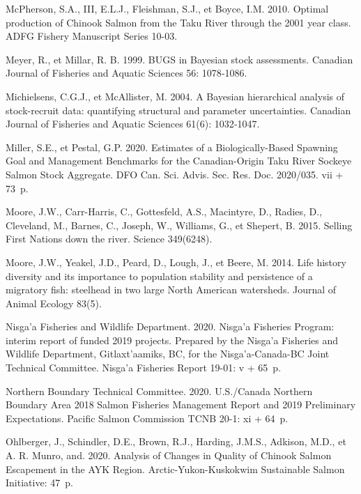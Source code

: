 \documentclass[french,11pt]{book}
\begin{document}
\begin{CSLReferences}{1}{0}
McPherson, S.A., III, E.L.J., Fleishman, S.J., et Boyce, I.M. 2010. {Optimal production of Chinook Salmon from the Taku River through the 2001 year class}. ADFG Fishery Manuscript Series 10-03.

Meyer, R., et Millar, R. B. 1999. {BUGS in Bayesian stock assessments}. Canadian Journal of Fisheries and Aquatic Sciences 56: 1078‑1086.

Michielsens, C.G.J., et McAllister, M. 2004. {A Bayesian hierarchical analysis of stock-recruit data: quantifying structural and parameter uncertainties}. Canadian Journal of Fisheries and Aquatic Sciences 61(6): 1032‑1047.

Miller, S.E., et Pestal, G.P. 2020. {Estimates of a Biologically-Based Spawning Goal and Management Benchmarks for the Canadian-Origin Taku River Sockeye Salmon Stock Aggregate}. DFO Can. Sci. Advis. Sec. Res. Doc. 2020/035. vii + 73~p.

Moore, J.W., Carr-Harris, C., Gottesfeld, A.S., Macintyre, D., Radies, D., Cleveland, M., Barnes, C., Joseph, W., Williams, G., et Shepert, B. 2015. {Selling First Nations down the river}. {Science} 349(6248).

Moore, J.W., Yeakel, J.D., Peard, D., Lough, J., et Beere, M. 2014. {Life history diversity and its importance to population stability and persistence of a migratory fish: steelhead in two large North American watersheds}. {Journal of Animal Ecology} 83(5).

Nisga'a Fisheries and Wildlife Department. 2020. {Nisga'a Fisheries Program: interim report of funded 2019 projects. Prepared by the Nisga'a Fisheries and Wildlife Department, Gitlaxt'aamiks, BC, for the Nisga'a-Canada-BC Joint Technical Committee}. {Nisga'a Fisheries Report} 19-01: v + 65~p.

Northern Boundary Technical Committee. 2020. {U.S./Canada Northern Boundary Area 2018 Salmon Fisheries Management Report and 2019 Preliminary Expectations}. Pacific Salmon Commission TCNB 20-1: xi + 64~p.

Ohlberger, J., Schindler, D.E., Brown, R.J., Harding, J.M.S., Adkison, M.D., et A. R. Munro, and. 2020. {Analysis of Changes in Quality of Chinook Salmon Escapement in the AYK Region}. {Arctic-Yukon-Kuskokwim Sustainable Salmon Initiative}: 47~p.


\end{CSLReferences}
\end{document}
